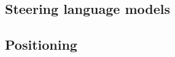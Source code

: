 \subsection{Steering language models}
\label{sec:related:steering}
\citep{zhang2024pasta,turner2023activation,rimsky2024steering,li2025fairsteer}

\subsection{Positioning}
